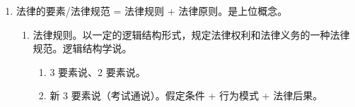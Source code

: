 \begin{enumerate}
        \begin{enumerate}
          \item 能不能满足人的需求、满足哪些需求、冲突处理。
          \item （受限的）自由。
                \begin{enumerate}
                  \item 伤害原则。禁止伤害、侵害他人合法权益。对象只能是他人。
                  \item 家长主义原则。避免自伤。。
                  \item 冒犯原则。对公众情感的伤害。公众反感。。
                  \item 道德主义原则。。
                \end{enumerate}
          \item 人权。人之为人，应当享受的权利，受到的尊重。
                \begin{enumerate}
                  \item 本源性。不依赖其他条件。
                  \item 历史性。
                  \item 人权法律化。保护角度。
                \end{enumerate}
          \item 正义、秩序。
          \item 冲突。矛盾、取舍。
                \begin{enumerate}
                  \item 价值位阶。有高下、主次之分。保高舍低，具体问题具体分析。。
                  \item 比例原则。成本和限度。。
                \end{enumerate}
        \end{enumerate}
  \item 法律的要素/法律规范 = 法律规则 + 法律原则。是上位概念。
        \begin{enumerate}
          \item 法律规则。以一定的逻辑结构形式，规定法律权利和法律义务的一种法律规范。逻辑结构学说。
                \begin{enumerate}
                  \item 3 要素说、2 要素说。
                  \item 新 3 要素说（考试通说）。假定条件 + 行为模式 + 法律后果。
                        \begin{enumerate}

\end{enumerate}
\end{enumerate}
\end{enumerate}
\end{enumerate}
